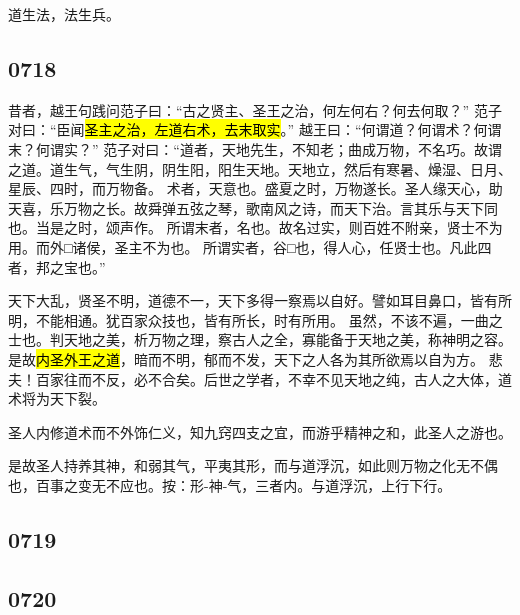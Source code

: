道生法，法生兵。

\subsection{0718}

昔者，越王句践问范子曰：“古之贤主、圣王之治，何左何右？何去何取？”
范子对曰：“臣闻\hl{圣主之治，左道右术，去末取实}。”
越王曰：“何谓道？何谓术？何谓末？何谓实？”
范子对曰：“道者，天地先生，不知老；曲成万物，不名巧。故谓之道。道生气，气生阴，阴生阳，阳生天地。天地立，然后有寒暑、燥湿、日月、星辰、四时，而万物备。
术者，天意也。盛夏之时，万物遂长。圣人缘天心，助天喜，乐万物之长。故舜弹五弦之琴，歌南风之诗，而天下治。言其乐与天下同也。当是之时，颂声作。
所谓末者，名也。故名过实，则百姓不附亲，贤士不为用。而外□诸侯，圣主不为也。
所谓实者，谷□也，得人心，任贤士也。凡此四者，邦之宝也。”

天下大乱，贤圣不明，道德不一，天下多得一察焉以自好。譬如耳目鼻口，皆有所明，不能相通。犹百家众技也，皆有所长，时有所用。
虽然，不该不遍，一曲之士也。判天地之美，析万物之理，察古人之全，寡能备于天地之美，称神明之容。
是故\hl{内圣外王之道}，暗而不明，郁而不发，天下之人各为其所欲焉以自为方。
悲夫！百家往而不反，必不合矣。后世之学者，不幸不见天地之纯，古人之大体，道术将为天下裂。

圣人内修道术而不外饰仁义，知九窍四支之宜，而游乎精神之和，此圣人之游也。

是故圣人持养其神，和弱其气，平夷其形，而与道浮沉，如此则万物之化无不偶也，百事之变无不应也。按：形-神-气，三者内。与道浮沉，上行下行。

\subsection{0719}

\subsection{0720}
